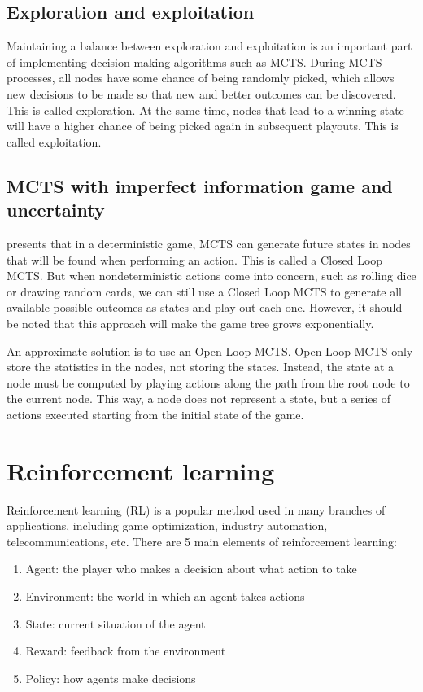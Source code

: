 \subsection{Exploration and exploitation}
Maintaining a balance between exploration and exploitation is an important part of implementing decision-making algorithms such as MCTS. During MCTS processes, all nodes have some chance of being randomly picked, which allows new decisions to be made so that new and better outcomes can be discovered. This is called exploration. At the same time, nodes that lead to a winning state will have a higher chance of being picked again in subsequent \glspl{playout}. This is called exploitation.


\subsection{MCTS with imperfect information game and uncertainty}

\cite{Perez_Liebana_2015} presents that in a deterministic game, MCTS can generate future states in nodes that will be found when performing an action. This is called a Closed Loop MCTS. But when nondeterministic actions come into concern, such as rolling dice or drawing random cards, we can still use a Closed Loop MCTS to generate all available possible outcomes as states and play out each one. However, it should be noted that this approach will make the game tree grows exponentially. 

An approximate solution is to use an Open Loop MCTS. Open Loop MCTS only store the statistics in the nodes, not storing the states. Instead, the state at a node must be computed by playing actions along the path from the root node to the current node. This way, a node does not represent a state, but a series of actions executed starting from the initial state of the game. 



\section{Reinforcement learning} %
Reinforcement learning (RL) is a popular method used in many branches of applications, including game optimization, industry automation, telecommunications, etc. There are 5 main elements of reinforcement learning:

\begin{enumerate}
  \item Agent: the player who makes a decision about what action to take
  \item Environment: the world in which an agent takes actions
  \item State: current situation of the agent
  \item Reward: feedback from the environment
  \item Policy: how agents make decisions
\end{enumerate}

